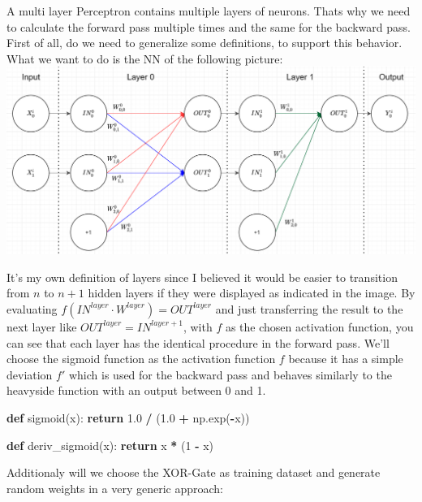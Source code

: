 \documentclass[
]{book}
\newenvironment{Shaded}{\begin{snugshade}}{\end{snugshade}}
\newcommand{\ControlFlowTok}[1]{\textcolor[rgb]{0.13,0.29,0.53}{\textbf{#1}}}
\newcommand{\DecValTok}[1]{\textcolor[rgb]{0.00,0.00,0.81}{#1}}
\newcommand{\FloatTok}[1]{\textcolor[rgb]{0.00,0.00,0.81}{#1}}
\newcommand{\KeywordTok}[1]{\textcolor[rgb]{0.13,0.29,0.53}{\textbf{#1}}}
\newcommand{\NormalTok}[1]{#1}
\newcommand{\OperatorTok}[1]{\textcolor[rgb]{0.81,0.36,0.00}{\textbf{#1}}}
\begin{document}
A multi layer Perceptron contains multiple layers of neurons. Thats why we need to calculate the forward pass multiple times and the same for the backward pass. First of all, do we need to generalize some definitions, to support this behavior. What we want to do is the NN of the following picture:\\
\includegraphics[width=1\textwidth,height=\textheight]{./img/NN_03_new.png}

It's my own definition of layers since I believed it would be easier to transition from \(n\) to \(n+1\) hidden layers if they were displayed as indicated in the image. By evaluating \(f(IN^{layer} \cdot W^{layer}) = OUT^{layer}\) and just transferring the result to the next layer like \(OUT^{layer} = IN^{layer+1}\), with \(f\) as the chosen activation function, you can see that each layer has the identical procedure in the forward pass.
We'll choose the sigmoid function as the activation function \(f\) because it has a simple deviation \(f'\) which is used for the backward pass and behaves similarly to the heavyside function with an output between 0 and 1.

\begin{Shaded}
\begin{Highlighting}[]
\KeywordTok{def}\NormalTok{ sigmoid(x):}
  \ControlFlowTok{return} \FloatTok{1.0} \OperatorTok{/}\NormalTok{ (}\FloatTok{1.0} \OperatorTok{+}\NormalTok{ np.exp(}\OperatorTok{{-}}\NormalTok{x))}

\KeywordTok{def}\NormalTok{ deriv\_sigmoid(x):}
  \ControlFlowTok{return}\NormalTok{ x }\OperatorTok{*}\NormalTok{ (}\DecValTok{1} \OperatorTok{{-}}\NormalTok{ x)}
\end{Highlighting}
\end{Shaded}

Additionaly will we choose the XOR-Gate as training dataset and generate random weights in a very generic approach:
\end{document}
